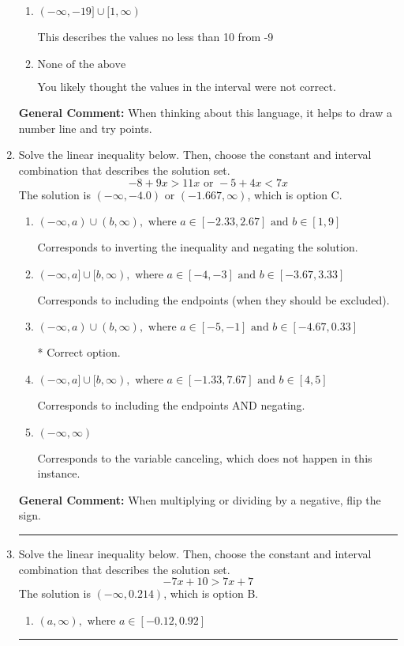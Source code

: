 \documentclass{extbook}[14pt]
\newcommand{\litem}[1]{\item #1

\rule{\textwidth}{0.4pt}}
\begin{document}
\begin{enumerate}
{\begin{enumerate}[label=\Alph*.]
This describes the values more than 10 from -9
\item \( (-\infty, -19] \cup [1, \infty) \)

This describes the values no less than 10 from -9
\item \( \text{None of the above} \)

You likely thought the values in the interval were not correct.
\end{enumerate}

\textbf{General Comment:} When thinking about this language, it helps to draw a number line and try points.
}
\litem{
Solve the linear inequality below. Then, choose the constant and interval combination that describes the solution set.
\[ -8 + 9 x > 11 x \text{ or } -5 + 4 x < 7 x \]The solution is \( (-\infty, -4.0) \text{ or } (-1.667, \infty) \), which is option C.\begin{enumerate}[label=\Alph*.]
\item \( (-\infty, a) \cup (b, \infty), \text{ where } a \in [-2.33, 2.67] \text{ and } b \in [1, 9] \)

Corresponds to inverting the inequality and negating the solution.
\item \( (-\infty, a] \cup [b, \infty), \text{ where } a \in [-4, -3] \text{ and } b \in [-3.67, 3.33] \)

Corresponds to including the endpoints (when they should be excluded).
\item \( (-\infty, a) \cup (b, \infty), \text{ where } a \in [-5, -1] \text{ and } b \in [-4.67, 0.33] \)

 * Correct option.
\item \( (-\infty, a] \cup [b, \infty), \text{ where } a \in [-1.33, 7.67] \text{ and } b \in [4, 5] \)

Corresponds to including the endpoints AND negating.
\item \( (-\infty, \infty) \)

Corresponds to the variable canceling, which does not happen in this instance.
\end{enumerate}

\textbf{General Comment:} When multiplying or dividing by a negative, flip the sign.
}
\litem{
Solve the linear inequality below. Then, choose the constant and interval combination that describes the solution set.
\[ -7x + 10 > 7x + 7 \]The solution is \( (-\infty, 0.214) \), which is option B.\begin{enumerate}[label=\Alph*.]
\item \( (a, \infty), \text{ where } a \in [-0.12, 0.92] \)


\end{enumerate}}
\end{enumerate}
\end{document}
